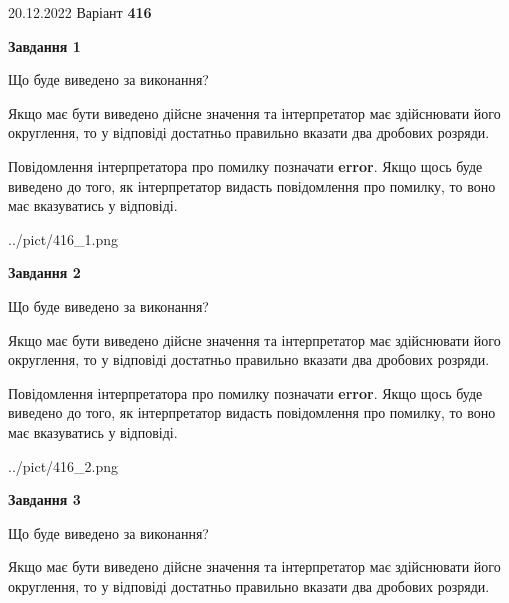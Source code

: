 \documentclass[12pt, ukrainian]{article}
\begin{document}
{20.12.2022 Варіант \No \textbf { 416 }\par}
{
\begin {Large}

{\begin {center}\textbf{Завдання 1}\end {center}}\par
Що буде виведено за виконання? \par

Якщо має бути виведено дійсне значення та інтерпретатор має здійснювати його округлення, 
то у відповіді достатньо правильно вказати два дробових розряди.

Повідомлення інтерпретатора про помилку позначати \textbf{error}.
Якщо щось буде виведено до того, як інтерпретатор видасть повідомлення про помилку, 
то воно має вказуватись у відповіді. \par

\begin{center}
	{../pict/416_1.png}
\end{center}
\newpage

{\begin {center}\textbf{Завдання 2}\end {center}}\par
Що буде виведено за виконання? \par

Якщо має бути виведено дійсне значення та інтерпретатор має здійснювати його округлення, 
то у відповіді достатньо правильно вказати два дробових розряди.

Повідомлення інтерпретатора про помилку позначати \textbf{error}.
Якщо щось буде виведено до того, як інтерпретатор видасть повідомлення про помилку, 
то воно має вказуватись у відповіді. \par

\begin{center}
	{../pict/416_2.png}
\end{center}
\newpage

{\begin {center}\textbf{Завдання 3}\end {center}}\par
Що буде виведено за виконання? \par

Якщо має бути виведено дійсне значення та інтерпретатор має здійснювати його округлення, 
то у відповіді достатньо правильно вказати два дробових розряди.


\end{Large}}
\end{document}

